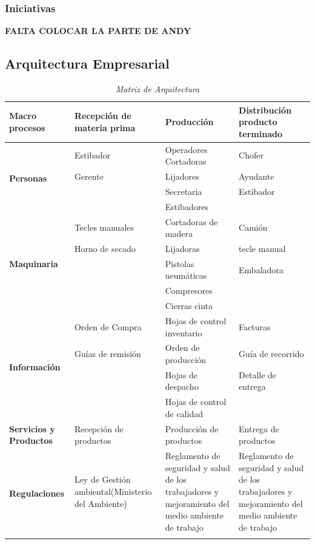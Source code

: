 \documentclass[12pt, a4paper]{article}
\begin{document}
\subsubsection{Iniciativas}

\textbf {FALTA COLOCAR LA PARTE DE ANDY} 


\subsection{Arquitectura Empresarial }
\begin{table}[H]
\centering
\caption{\textit{{Matriz de Arquitectura}}}
\label{Matriz:Arquitectura}
\begin{tabular}{|p{2cm}|p{3.5cm}|p{4cm}|p{4cm}|}
\hline
\multicolumn{1}{|p{2.5cm}|}{\textbf{Macro procesos}} & \textbf{Recepción de materia prima} & \textbf{Producción} & \textbf{Distribución producto terminado} \\ \hline
\multirow{4}{2.5cm}{\textbf{Personas}} & Estibador & Operadores Cortadoras & Chofer \\ \cline{2-4} 
 & Gerente & Lijadores & Ayudante \\ \cline{2-4} 
 &  & Secretaria & Estibador \\ \cline{2-4} 
 &  & Estibadores &  \\ \hline
\multirow{5}{2.5cm}{\textbf{Maquinaria}} & Tecles manuales & Cortadoras de madera & Camión \\ \cline{2-4} 
 & Horno de secado & Lijadoras & tecle manual \\ \cline{2-4} 
 &  & Pistolas neumáticas & Embaladora \\ \cline{2-4} 
 &  & Compresores &  \\ \cline{2-4} 
 &  & Cierras cinta &  \\ \hline
\multirow{4}{2.5cm}{\textbf{Información}} & Orden de Compra & Hojas de control inventario & Facturas \\ \cline{2-4} 
 & Guías de remisión & Orden de producción & Guía de recorrido \\ \cline{2-4} 
 &  & Hojas de despacho & Detalle de entrega \\ \cline{2-4} 
 &  & Hojas de control de calidad &  \\ \hline
\multicolumn{1}{|p{2.5cm}|}{\textbf{Servicios y Productos}} & Recepción de productos & Producción de productos & Entrega de productos \\ \hline
\multirow{4}{2cm}{\textbf{Regulaciones}} & Ley de Gestión ambiental(Ministerio del Ambiente) & Reglamento de seguridad y salud de los trabajadores y mejoramiento del medio ambiente de trabajo & Reglamento de seguridad y salud de los trabajadores y mejoramiento del medio ambiente de trabajo \\ \cline{2-4} 

\end{tabular}
\end{table}
\end{document}
